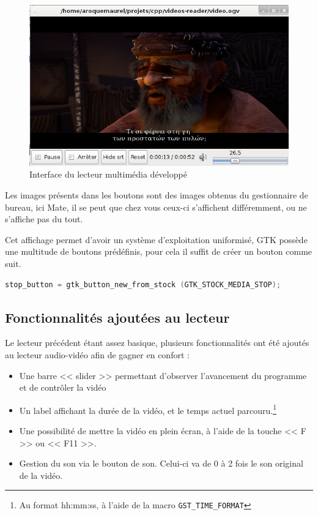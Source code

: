 \documentclass[a4paper, 11pt]{article}
\begin{document}
	\begin{figure}[H]
		\centering
		\includegraphics[width=15cm]{img/3.png}
		\caption{Interface du lecteur multimédia développé}
	\end{figure}
	\begin{remarque}
		Les images présents dans les boutons sont des images obtenus du gestionnaire de bureau, ici Mate, il se peut que chez vous ceux-ci s'affichent
		différemment, ou ne s'affiche pas du tout. 

		Cet affichage permet d'avoir un système d'exploitation uniformisé, GTK possède une multitude de boutons prédéfinis, pour cela il suffit de créer un
		bouton comme suit.
		\begin{lstlisting}[language=C, numbers=none,linewidth=400px ]
			stop_button = gtk_button_new_from_stock (GTK_STOCK_MEDIA_STOP);
		\end{lstlisting}
	\end{remarque}

	\subsection{Fonctionnalités ajoutées au lecteur}
	Le lecteur précédent étant assez basique, plusieurs fonctionnalités ont été ajoutés au lecteur audio-vidéo afin de gagner en confort : 
	\begin{itemize}
		\item Une barre << slider >> permettant d'observer l'avancement du programme et de contrôler la vidéo
		\item Un label affichant la durée de la vidéo, et le
			temps actuel parcouru.\footnote{Au format hh:mm:ss, à l'aide de la macro \texttt{GST\_TIME\_FORMAT}}
		\item Une possibilité de mettre la vidéo en plein écran, à l'aide de la touche << F >> ou << F11 >>.
		\item Gestion du son via le bouton de son. Celui-ci va de 0 à 2 fois le son original de la vidéo.
	\end{itemize}
\end{document}
